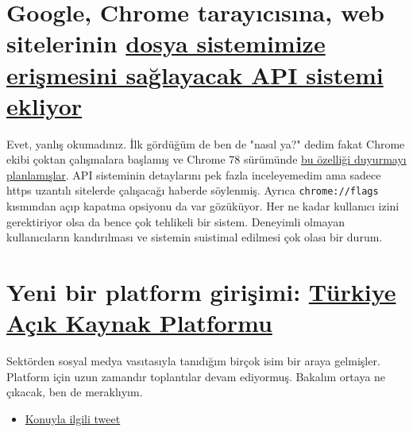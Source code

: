 \documentclass[11pt]{article}
\begin{document}
\section{Google, Chrome tarayıcısına, web sitelerinin \href{https://www.techrepublic.com/article/google-moves-closer-to-letting-chrome-web-apps-edit-your-files-despite-warning-it-could-be-abused-in-terrible-ways/}{dosya sistemimize erişmesini sağlayacak API sistemi ekliyor}}
\label{sec:orga7a90d0}
Evet, yanlış okumadınız. İlk gördüğüm de ben de "nasıl ya?" dedim fakat Chrome
ekibi çoktan çalışmalara başlamış ve Chrome 78 sürümünde \href{https://developers.google.com/web/updates/2019/08/native-file-system}{bu özelliği duyurmayı
planlamışlar}. API sisteminin detaylarını pek fazla inceleyemedim ama sadece
https uzantılı sitelerde çalışacağı haberde söylenmiş. Ayrıca \texttt{chrome://flags}
kısmından açıp kapatma opsiyonu da var gözüküyor. Her ne kadar kullanıcı izini
gerektiriyor olsa da bence çok tehlikeli bir sistem. Deneyimli olmayan
kullanıcıların kandırılması ve sistemin suistimal edilmesi çok olası bir durum.
\section{Yeni bir platform girişimi: \href{https://acikkaynakplatformu.github.io/}{Türkiye Açık Kaynak Platformu}}
\label{sec:org4814097}
Sektörden sosyal medya vasıtasıyla tanıdığım birçok isim bir araya gelmişler.
Platform için uzun zamandır toplantılar devam ediyormuş. Bakalım ortaya ne
çıkacak, ben de meraklıyım.

\begin{itemize}
\item \href{https://twitter.com/fkadev/status/1167076567366942720}{Konuyla ilgili tweet}
\end{itemize}
\end{document}
